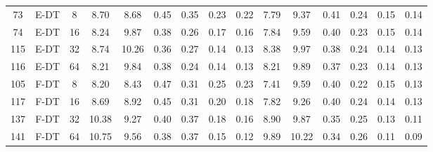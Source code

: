 \begin{table}
\begin{tabular}{@{\hskip3pt}c@{\hskip3pt}c@{\hskip3pt}c@{\hskip3pt}c@{\hskip3pt}c@{\hskip3pt}c@{\hskip3pt}c@{\hskip3pt}c@{\hskip3pt}c@{\hskip3pt}c@{\hskip3pt}c@{\hskip3pt}c@{\hskip3pt}c@{\hskip3pt}c@{\hskip3pt}c}
         73 &           E-DT &                   8 &              8.70 &        8.68 &          0.45 &        0.35 &        0.23 &         0.22 &                7.79 &        9.37 &          0.41 &        0.24 &        0.15 &         0.14 \\
         74 &           E-DT &                  16 &              8.24 &        9.87 &          0.38 &        0.26 &        0.17 &         0.16 &                7.84 &        9.59 &          0.40 &        0.23 &        0.15 &         0.14 \\
        115 &           E-DT &                  32 &              8.74 &       10.26 &          0.36 &        0.27 &        0.14 &         0.13 &                8.38 &        9.97 &          0.38 &        0.24 &        0.14 &         0.13 \\
        116 &           E-DT &                  64 &              8.21 &        9.84 &          0.38 &        0.24 &        0.14 &         0.13 &                8.21 &        9.89 &          0.37 &        0.23 &        0.14 &         0.13 \\
        105 &           F-DT &                   8 &              8.20 &        8.43 &          0.47 &        0.31 &        0.25 &         0.23 &                7.41 &        9.59 &          0.40 &        0.22 &        0.15 &         0.13 \\
        117 &           F-DT &                  16 &              8.69 &        8.92 &          0.45 &        0.31 &        0.20 &         0.18 &                7.82 &        9.26 &          0.40 &        0.24 &        0.14 &         0.13 \\
        137 &           F-DT &                  32 &             10.38 &        9.27 &          0.40 &        0.37 &        0.18 &         0.16 &                8.90 &        9.87 &          0.35 &        0.25 &        0.13 &         0.11 \\
        141 &           F-DT &                  64 &             10.75 &        9.56 &          0.38 &        0.37 &        0.15 &         0.12 &                9.89 &       10.22 &          0.34 &        0.26 &        0.11 &         0.09 \\
\bottomrule
\end{tabular}
\end{table}
